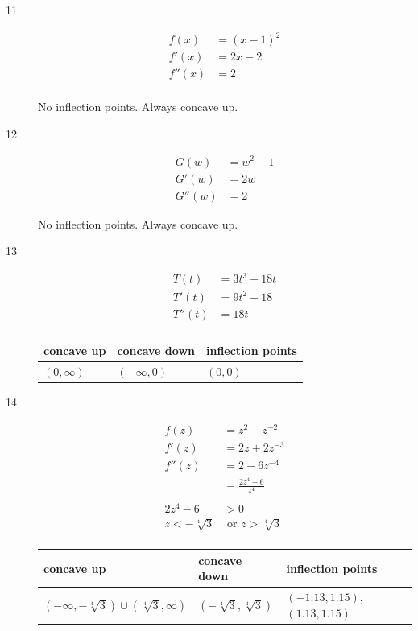 \documentclass[fleqn]{exam}
\begin{document}
\begin{description}
\item[11]
\begin{align*}
  f(x)   &= (x-1)^2 \\
  f'(x)  &= 2x - 2 \\
  f''(x) &= 2 \\
\end{align*}

No inflection points. Always concave up.

\item[12]
\begin{align*}
  G(w)   &= w^2 - 1 \\
  G'(w)  &= 2w \\
  G''(w) &= 2
\end{align*}

No inflection points. Always concave up.

\item[13]
\begin{align*}
  T(t)   &= 3t^3 - 18t \\
  T'(t)  &= 9t^2 - 18 \\
  T''(t) &= 18t \\
\end{align*}

\begin{tabular}{lll}
\toprule
concave up    & concave down   & inflection points \\
\midrule
$(0, \infty)$ & $(-\infty, 0)$ & $(0, 0)$ \\
\bottomrule
\end{tabular}

\item[14]
\begin{align*}
  f(z)   &= z^2 - z^{-2} \\
  f'(z)  &= 2z + 2z^{-3} \\
  f''(z) &= 2 - 6z^{-4} \\
         &= \frac{2z^4 - 6}{z^4} \\
\\
  2z^4 - 6 &> 0 \\
  z < -\sqrt[4]{3} & \text{ or } z > \sqrt[4]{3} \\
\end{align*}

\begin{tabular}{lll}
\toprule
concave up & concave down & inflection points\\
\midrule
$(-\infty, - \sqrt[4]{3}) \cup (\sqrt[4]{3}, \infty)$ & $(-\sqrt[4]{3}, \sqrt[4]{3})$ & $(-1.13, 1.15)$, $(1.13, 1.15)$ \\
\bottomrule
\end{tabular}


\end{description}
\end{document}
